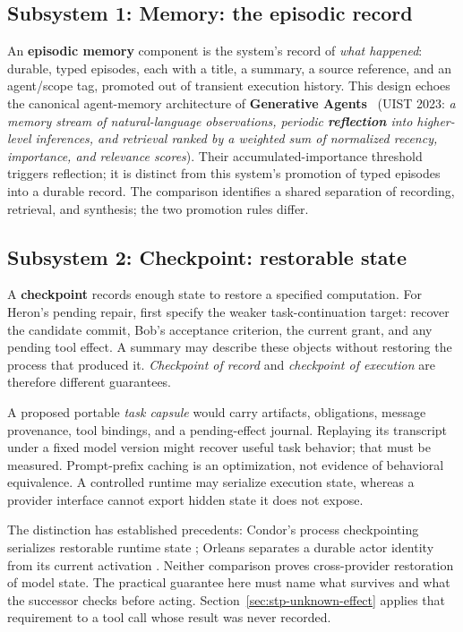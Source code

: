 \documentclass[11pt,a4paper]{article}
\theoremstyle{definition}
\begin{document}
\subsection{Subsystem 1: Memory: the episodic record}
\pdstatus{\Built}{}

An \textbf{episodic memory} component is the system's record of \emph{what
happened}: durable, typed episodes, each with a title, a summary, a source
reference, and an agent/scope tag, promoted out of transient execution history.
This design echoes the canonical agent-memory architecture of \textbf{Generative
Agents}~ (UIST 2023: \emph{a memory stream of
natural-language observations, periodic \textbf{reflection} into higher-level
inferences, and retrieval ranked by a weighted sum of normalized recency,
importance, and relevance scores}). Their accumulated-importance threshold
triggers reflection; it is distinct from this system's promotion of typed
episodes into a durable record. The comparison identifies a shared separation
of recording, retrieval, and synthesis; the two promotion rules differ.

\subsection{Subsystem 2: Checkpoint: restorable state}

A \textbf{checkpoint} records enough state to restore a specified computation.
For Heron's pending repair, first specify the weaker task-continuation target:
recover the candidate commit, Bob's acceptance criterion, the current grant,
and any pending tool effect. A summary may describe these objects without
restoring the process that produced it. \emph{Checkpoint of record} and
\emph{checkpoint of execution} are therefore different guarantees.

A proposed portable \emph{task capsule} would carry artifacts, obligations, message
provenance, tool bindings, and a pending-effect journal. Replaying its transcript
under a fixed model version might recover useful task behavior; that must be
measured. Prompt-prefix caching is an optimization, not evidence of behavioral
equivalence. A controlled runtime may serialize execution state, whereas a
provider interface cannot export hidden state it does not expose.

The distinction has established precedents: Condor's process checkpointing
serializes restorable runtime state ; Orleans separates
a durable actor identity from its current activation
. Neither comparison proves cross-provider
restoration of model state. The practical guarantee here must name what survives
and what the successor checks before acting. Section~\ref{sec:stp-unknown-effect}
applies that requirement to a tool call whose result was never recorded.
\end{document}
